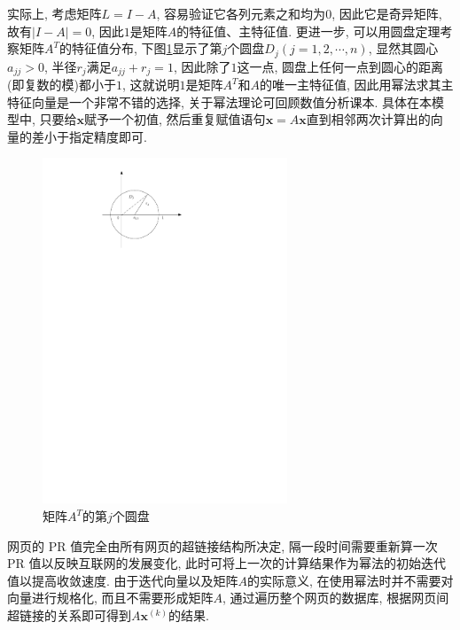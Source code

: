 \documentclass[a4paper,UTF8]{ctexart}
\theoremstyle{plain} \newtheorem{theorem}{定理}[section]
\theoremstyle{plain} \newtheorem{definition}{定义}[section]
\theoremstyle{plain} \newtheorem{lemma}{引理}[section]
\theoremstyle{plain} \newtheorem{proposition}{命题}[section]
\theoremstyle{plain} \newtheorem{example}{例}[section]
\theoremstyle{plain} \newtheorem{remark}{注}[section]
\theoremstyle{plain} \newtheorem{corollary}{推论}[section]
\begin{document}
实际上, 考虑矩阵$L = I - A$, 容易验证它各列元素之和均为$0$, 因此它是奇异矩阵, 故有$|I - A| = 0$, 因此$1$是矩阵$A$的特征值、主特征值. 更进一步, 可以用圆盘定理考察矩阵$A^{T}$的特征值分布, 下图\ref{circle}显示了第$j$个圆盘$D_{j}(j = 1,2,\cdots,n)$, 显然其圆心$a_{jj} > 0$, 半径$r_j$满足$a_{jj} + r_{j} = 1$, 因此除了$1$这一点, 圆盘上任何一点到圆心的距离(即复数的模)都小于$1$, 这就说明$1$是矩阵$A^{T}$和$A$的唯一主特征值, 因此用幂法求其主特征向量是一个非常不错的选择, 关于幂法理论可回顾数值分析课本. 具体在本模型中, 只要给$\bm{x}$赋予一个初值, 然后重复赋值语句$\bm{x} = A \bm{x}$直到相邻两次计算出的向量的差小于指定精度即可.
\begin{figure}[!htb]
  \centering
  \includegraphics[width=0.65\textwidth]{circle.pdf}
  \caption{矩阵$A^{T}$的第$j$个圆盘}
  \label{circle}
\end{figure}


网页的 PR 值完全由所有网页的超链接结构所决定, 隔一段时间需要重新算一次 PR 值以反映互联网的发展变化, 此时可将上一次的计算结果作为幂法的初始迭代值以提高收敛速度. 由于迭代向量以及矩阵$A$的实际意义, 在使用幂法时并不需要对向量进行规格化, 而且不需要形成矩阵$A$, 通过遍历整个网页的数据库, 根据网页间超链接的关系即可得到$A \bm{x}^{(k)}$的结果.
\end{document}
